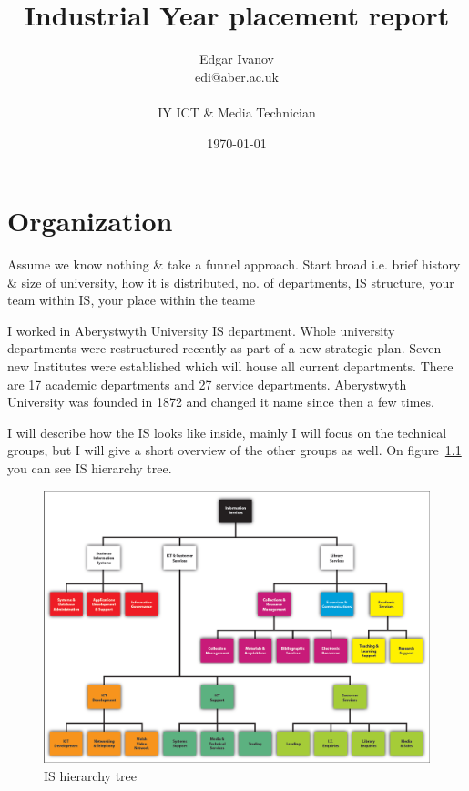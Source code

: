 \documentclass[10pt,a4paper,headinclude=true]{report}
\begin{document}
\title{Industrial Year placement report}
\author{Edgar Ivanov\\ edi@aber.ac.uk \\ \\ IY ICT \& Media Technician}
\date{\today}
\maketitle

\tableofcontents

\chapter{Organization}
Assume we know nothing \& take a funnel approach. Start broad i.e. brief history \&
size of university, how it is distributed, no. of departments, IS structure, your
team within IS, your place within the teame

I worked in Aberystwyth University IS department. Whole university departments were restructured recently as part of a new strategic plan. Seven new Institutes were established which will house all current departments. There are 17 academic departments and 27 service departments. Aberystwyth University was founded in 1872 and changed it name since then a few times.



I will describe how the IS looks like inside, mainly I will focus on the technical groups, but I will give a short overview of the other groups as well. On figure~\ref{fig:i-s-hierarchy-tree-march-2012} you can see IS hierarchy tree.

\begin{figure}[H]
\centering
\centerline{\includegraphics[scale=0.55]{./i-s-hierarchy-tree-march-2012}}
\caption{IS hierarchy tree}
\label{fig:i-s-hierarchy-tree-march-2012}
\end{figure}
\end{document}
